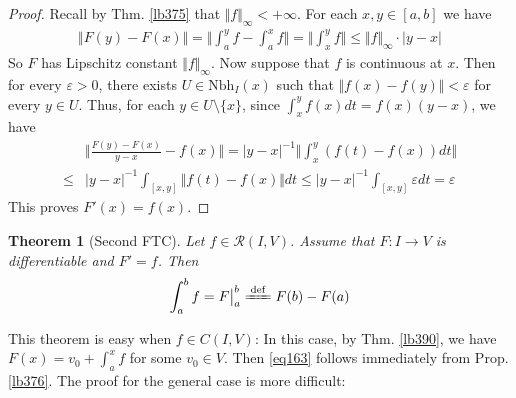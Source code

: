 \documentclass[12pt,b5paper,notitlepage]{article}
\theoremstyle{definition}
\theoremstyle{plain}
\newtheorem{thm}[df]{Theorem}
\newcommand{\scr}{\mathscr}
\newcommand{\Nbh}{\mathrm{Nbh}}
\newcommand{\eps}{\varepsilon}
\numberwithin{equation}{section}
\begin{document}
\begin{proof}
Recall by Thm. \ref{lb375} that $\Vert f\Vert_\infty<+\infty$. For each $x,y\in[a,b]$ we have
\begin{align*}
\Vert F(y)-F(x)\Vert=\Big\Vert\int_a^y f-\int_a^x f \Big\Vert=\Big\Vert\int_x^y f \Big\Vert\leq \Vert f\Vert_\infty\cdot|y-x|
\end{align*}
So $F$ has Lipschitz constant $\Vert f\Vert_\infty$. Now suppose that $f$ is continuous at $x$. Then for every $\eps>0$, there exists $U\in\Nbh_I(x)$ such that $\Vert f(x)-f(y)\Vert<\eps$ for every $y\in U$. Thus, for each $y\in U\setminus\{x\}$, since $\int_x^y f(x)dt=f(x)(y-x)$, we have
\begin{align*}
&\Big\Vert \frac{F(y)-F(x)}{y-x}-f(x)\Big\Vert=|y-x|^{-1}\Big\Vert \int_x^y (f(t)-f(x))dt\Big\Vert\\
\leq& |y-x|^{-1}\int_{[x,y]}\Vert f(t)-f(x)\Vert dt\leq |y-x|^{-1}\int_{[x,y]}\eps dt=\eps
\end{align*}
This proves $F'(x)=f(x)$.
\end{proof}


\begin{thm}[Second FTC]\label{lb391}
Let $f\in\scr R(I,V)$. Assume that $F:I\rightarrow V$ is differentiable and $F'=f$. Then
\begin{align}
\int_a^bf=F\big|^b_a\xlongequal{\mathrm{def}} F(b)-F(a)  \label{eq163}
\end{align}
\end{thm}

This theorem is easy when $f\in C(I,V)$: In this case,   by Thm. \ref{lb390}, we have $F(x)=v_0+\int_a^x f$ for some $v_0\in V$. Then \eqref{eq163} follows immediately from Prop. \ref{lb376}. The proof for the general case is more difficult:
\end{document}
